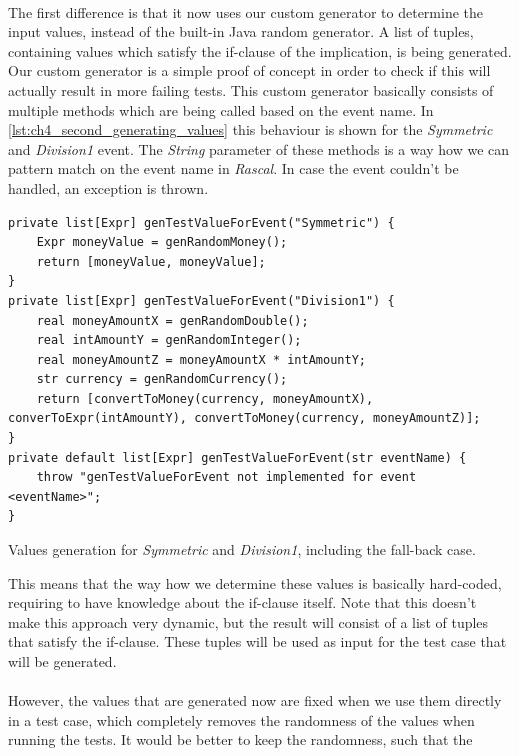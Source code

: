 \\
The first difference is that it now uses our custom generator to determine the
input values, instead of the built-in Java random generator. A list of tuples,
containing values which satisfy the if-clause of the implication, is being
generated. Our custom generator is a simple proof of concept in order to check
if this will actually result in more failing tests. This custom generator
basically consists of multiple methods which are being called based on the event
name. In \autoref{lst:ch4_second_generating_values} this behaviour is shown for
the \textit{Symmetric} and \textit{Division1} event. The \textit{String}
parameter of these methods is a way how we can pattern match on the event name
in \textit{Rascal}. In case the event couldn't be handled, an exception is
thrown.
\begin{sourcecode}[!ht]
\begin{lstlisting}[language=Rascal]
private list[Expr] genTestValueForEvent("Symmetric") {
    Expr moneyValue = genRandomMoney();
    return [moneyValue, moneyValue];
}
private list[Expr] genTestValueForEvent("Division1") {
    real moneyAmountX = genRandomDouble();
    real intAmountY = genRandomInteger();
    real moneyAmountZ = moneyAmountX * intAmountY;
    str currency = genRandomCurrency();
    return [convertToMoney(currency, moneyAmountX), converToExpr(intAmountY), convertToMoney(currency, moneyAmountZ)];
}
private default list[Expr] genTestValueForEvent(str eventName) {
    throw "genTestValueForEvent not implemented for event <eventName>";
}
\end{lstlisting}
\caption{Values generation for \textit{Symmetric} and \textit{Division1}, including the fall-back case.}
\label{lst:ch4_second_generating_values}
\end{sourcecode}
\FloatBarrier\noindent
This means that the way how we determine these values is basically hard-coded,
requiring to have knowledge about the if-clause itself. Note that this doesn't
make this approach very dynamic, but the result will consist of a list of tuples
that satisfy the if-clause. These tuples will be used as input for the test case
that will be generated.\\
\\
However, the values that are generated now are fixed when we use them directly
in a test case, which completely removes the randomness of the values when
running the tests. It would be better to keep the randomness, such that the
